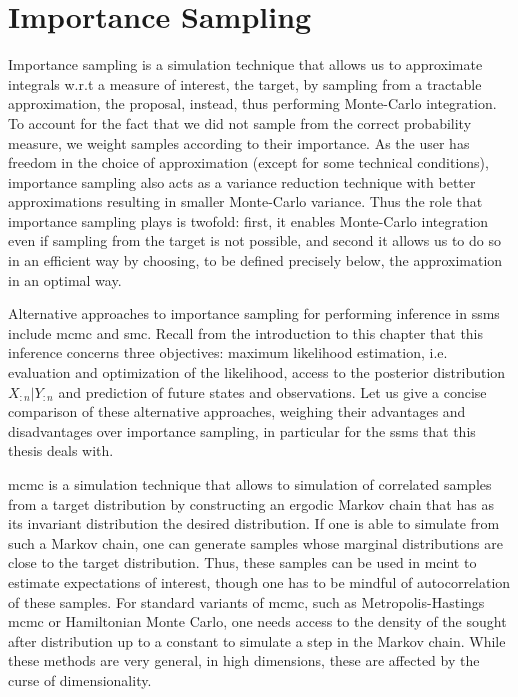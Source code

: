 \section{Importance Sampling}
\label{sec:importance_sampling}
Importance sampling is a simulation technique that allows us to approximate integrals w.r.t a measure of interest, the target, by sampling from a tractable approximation, the proposal, instead, thus performing Monte-Carlo integration. To account for the fact that we did not sample from the correct probability measure, we weight samples according to their importance. As the user has freedom in the choice of approximation (except for some technical conditions), importance sampling also acts as a variance reduction technique with better approximations resulting in smaller Monte-Carlo variance. Thus the role that importance sampling plays is twofold: first, it enables Monte-Carlo integration even if sampling from the target is not possible, and second it allows us to do so in an efficient way by choosing, to be defined precisely below, the approximation in an optimal way.

Alternative approaches to importance sampling for performing inference in \glspl{ssm} include \gls{mcmc} and \gls{smc}. 
Recall from the introduction to this chapter that this inference concerns three objectives: maximum likelihood estimation, i.e. evaluation and optimization of the likelihood, access to the posterior distribution $X_{:n} | Y_{:n}$ and prediction of future states and observations. Let us give a concise comparison of these alternative approaches, weighing their advantages and disadvantages over importance sampling, in particular for the \glspl{ssm} that this thesis deals with. 

\gls{mcmc} \citep{Brooks2011Handbook} is a simulation technique that allows to simulation of correlated samples from a target distribution by constructing an ergodic Markov chain that has as its invariant distribution the desired distribution. 
If one is able to simulate from such a Markov chain, one can generate samples whose marginal distributions are close to the target distribution.
Thus, these samples can be used in \acrshort{mcint} to estimate expectations of interest, though one has to be mindful of autocorrelation of these samples.
For standard variants of \acrshort{mcmc}, such as Metropolis-Hastings \gls{mcmc} or Hamiltonian Monte Carlo, one needs access to the density of the sought after distribution up to a constant to simulate a step in the Markov chain. While these methods are very general, in high dimensions, these are affected by the curse of dimensionality. 

